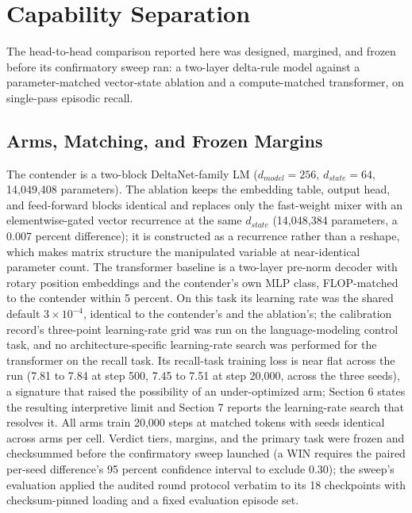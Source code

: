 \section{Capability Separation}

The head-to-head comparison reported here was designed, margined, and
frozen before its confirmatory sweep ran: a two-layer delta-rule model
against a parameter-matched vector-state ablation and a compute-matched
transformer, on single-pass episodic recall.

\subsection{Arms, Matching, and Frozen Margins}

The contender is a two-block DeltaNet-family LM ($d_{model}=256$,
$d_{state}=64$, 14,049,408 parameters). The
ablation keeps the embedding table, output head, and feed-forward
blocks identical and replaces only the fast-weight mixer with an
elementwise-gated vector recurrence at the same $d_{state}$
(14,048,384 parameters, a 0.007 percent difference); it is constructed as a recurrence rather than a
reshape, which makes matrix structure the manipulated variable at
near-identical parameter count. The transformer baseline is a two-layer pre-norm
decoder with rotary position embeddings and the contender's own MLP
class, FLOP-matched to the contender within 5 percent. On this task its learning rate was the shared
default $3 \times 10^{-4}$, identical to the contender's and the
ablation's; the calibration record's three-point
learning-rate grid was run on the language-modeling control task, and
no architecture-specific learning-rate search was performed for the
transformer on the recall task. Its recall-task
training loss is near flat across the run (7.81 to 7.84 at step 500,
7.45 to 7.51 at step 20,000, across the three seeds), a signature that raised the possibility of an
under-optimized arm; Section 6 states the resulting interpretive limit
and Section 7 reports the learning-rate search that resolves it. All arms train 20,000 steps at
matched tokens with seeds identical across arms per cell.
Verdict tiers, margins, and the primary task were frozen and checksummed
before the confirmatory sweep launched (a WIN requires the paired
per-seed difference's 95 percent confidence interval to exclude 0.30);
the sweep's evaluation applied the audited round protocol verbatim to
its 18 checkpoints with checksum-pinned loading and a fixed evaluation
episode set.

